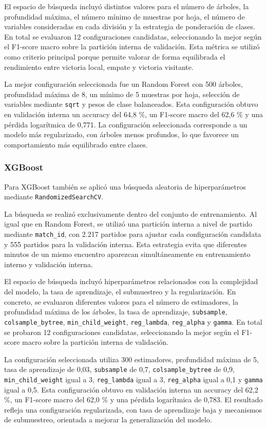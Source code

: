 El espacio de búsqueda incluyó distintos valores para el número de árboles, la profundidad máxima, el número mínimo de muestras por hoja, el número de variables consideradas en cada división y la estrategia de ponderación de clases. En total se evaluaron 12 configuraciones candidatas, seleccionando la mejor según el F1-score macro sobre la partición interna de validación. Esta métrica se utilizó como criterio principal porque permite valorar de forma equilibrada el rendimiento entre victoria local, empate y victoria visitante.

La mejor configuración seleccionada fue un Random Forest con 500 árboles, profundidad máxima de 8, un mínimo de 5 muestras por hoja, selección de variables mediante \texttt{sqrt} y pesos de clase balanceados. Esta configuración obtuvo en validación interna un accuracy del 64,8 \%, un F1-score macro del 62,6 \% y una pérdida logarítmica de 0,771. La configuración seleccionada corresponde a un modelo más regularizado, con árboles menos profundos, lo que favorece un comportamiento más equilibrado entre clases.

\subsubsection{XGBoost}

Para XGBoost también se aplicó una búsqueda aleatoria de hiperparámetros mediante \texttt{RandomizedSearchCV}.

La búsqueda se realizó exclusivamente dentro del conjunto de entrenamiento. Al igual que en Random Forest, se utilizó una partición interna a nivel de partido mediante \texttt{match\_id}, con 2.217 partidos para ajustar cada configuración candidata y 555 partidos para la validación interna. Esta estrategia evita que diferentes minutos de un mismo encuentro aparezcan simultáneamente en entrenamiento interno y validación interna.

El espacio de búsqueda incluyó hiperparámetros relacionados con la complejidad del modelo, la tasa de aprendizaje, el submuestreo y la regularización. En concreto, se evaluaron diferentes valores para el número de estimadores, la profundidad máxima de los árboles, la tasa de aprendizaje, \texttt{subsample}, \texttt{colsample\_bytree}, \texttt{min\_child\_weight}, \texttt{reg\_lambda}, \texttt{reg\_alpha} y \texttt{gamma}. En total se probaron 12 configuraciones candidatas, seleccionando la mejor según el F1-score macro sobre la partición interna de validación.

La configuración seleccionada utiliza 300 estimadores, profundidad máxima de 5, tasa de aprendizaje de 0,03, \texttt{subsample} de 0,7, \texttt{colsample\_bytree} de 0,9, \texttt{min\_child\_weight} igual a 3, \texttt{reg\_lambda} igual a 3, \texttt{reg\_alpha} igual a 0,1 y \texttt{gamma} igual a 0,5. Esta configuración obtuvo en validación interna un accuracy del 62,2 \%, un F1-score macro del 62,0 \% y una pérdida logarítmica de 0,783. El resultado refleja una configuración regularizada, con tasa de aprendizaje baja y mecanismos de submuestreo, orientada a mejorar la generalización del modelo.

